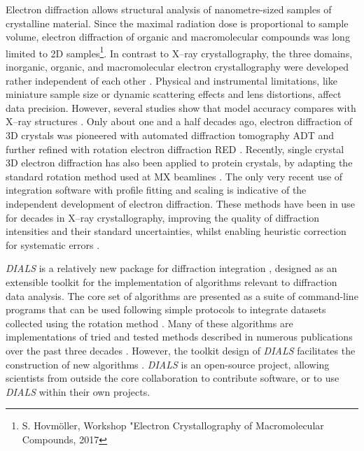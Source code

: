 \documentclass[preprint]{iucr}
\newcommand{\dials}{\emph{DIALS}\xspace}
\begin{document}
Electron diffraction allows structural analysis of nanometre-sized samples of
crystalline material. Since the maximal radiation dose is proportional to
sample volume, electron diffraction of organic and macromolecular compounds was
long limited to 2D samples\footnote{S. Hovm{\"o}ller, Workshop "Electron
Crystallography of Macromolecular Compounds, 2017}\cite{unwin-henderson:1975}.
In contrast to X--ray crystallography, the three domains, inorganic, organic,
and macromolecular electron crystallography were developed rather independent
of each other
\cite{vainshtein:1964,dorset:1995,glaeser_downing_derosier:2007,zou:2011}.
Physical and instrumental limitations, like miniature sample size or dynamic
scattering effects and lens distortions, affect data precision. However,
several studies show that model accuracy compares with X--ray structures
\cite{weirich:1996,zeo_adt:2014,dorset:1992,palatinus:2017}. Only about one and
a half decades ago, electron diffraction of 3D crystals was pioneered with
automated diffraction tomography ADT and further refined with rotation electron
diffraction RED \cite{adt:2007,rotmethod_e:2010,gemmi_adt:2015}. Recently,
single crystal 3D electron diffraction has also been applied to protein
crystals, by adapting the standard rotation method used at MX beamlines
\cite{Nederlof2013,Hattne2015,Yonekura2015,Clabbers2017}. The only very recent use of
integration software with profile fitting and scaling is indicative of the
independent development of electron diffraction. These methods have been in use
for decades in X--ray crystallography, improving the quality of diffraction
intensities and their standard uncertainties, whilst enabling heuristic
correction for systematic errors \cite{pflugrath:1999,leslie1999integration}.

\dials is a relatively new package for diffraction integration
\cite{Winter2018}, designed as an extensible toolkit for the implementation of
algorithms relevant to diffraction data analysis. The core set of algorithms
are presented as a suite of command-line programs that can be used following
simple protocols to integrate datasets collected using the rotation method
\cite{Arndt1977}. Many of these algorithms are implementations of tried and
tested methods described in numerous publications over the past three decades
\cite{leslie1999integration,LURE1986phase1and2,LURE1986phase3,kabsch2010xds}.
However, the toolkit design of \dials facilitates the construction of new
algorithms \cite{Gildea2014,Parkhurst2016,Parkhurst2017}. \dials is an
open-source project, allowing scientists from outside the core collaboration to
contribute software, or to use \dials within their own projects.
\end{document}

